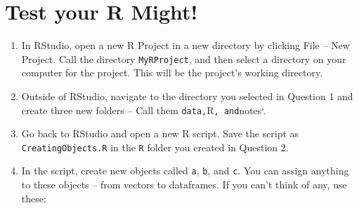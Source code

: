 \documentclass[]{book}
\newenvironment{Shaded}{\begin{snugshade}}{\end{snugshade}}
\newcommand{\KeywordTok}[1]{\textcolor[rgb]{0.13,0.29,0.53}{\textbf{#1}}}
\newcommand{\DecValTok}[1]{\textcolor[rgb]{0.00,0.00,0.81}{#1}}
\newcommand{\StringTok}[1]{\textcolor[rgb]{0.31,0.60,0.02}{#1}}
\newcommand{\OperatorTok}[1]{\textcolor[rgb]{0.81,0.36,0.00}{\textbf{#1}}}
\newcommand{\NormalTok}[1]{#1}
\theoremstyle{definition}
\theoremstyle{definition}
\theoremstyle{remark}
\begin{document}
\section{Test your R Might!}\label{test-your-r-might-3}

\begin{enumerate}
\def\labelenumi{\arabic{enumi}.}
\item
  In RStudio, open a new R Project in a new directory by clicking File
  -- New Project. Call the directory \texttt{MyRProject}, and then
  select a directory on your computer for the project. This will be the
  project's working directory.
\item
  Outside of RStudio, navigate to the directory you selected in Question
  1 and create three new folders -- Call them
  \texttt{data,}R\texttt{,\ and}notes`.
\item
  Go back to RStudio and open a new R script. Save the script as
  \texttt{CreatingObjects.R} in the \texttt{R} folder you created in
  Question 2.
\item
  In the script, create new objects called \texttt{a}, \texttt{b}, and
  \texttt{c}. You can assign anything to these objects -- from vectors
  to dataframes. If you can't think of any, use these:
\end{enumerate}

\begin{Shaded}
\end{Shaded}
\end{document}
